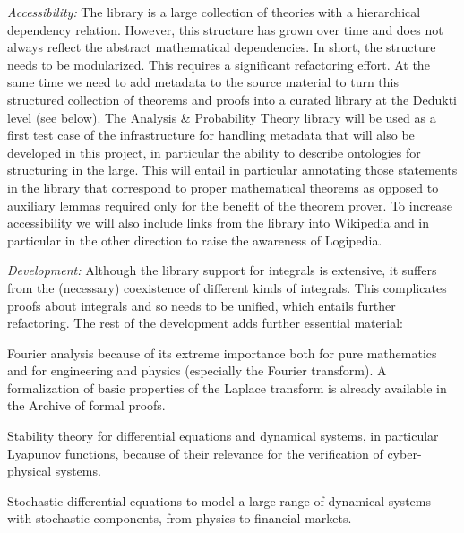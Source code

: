 \emph{Accessibility:}
The library is a large collection of theories with a hierarchical dependency
relation. However, this structure has grown over time and does not always
reflect the abstract mathematical dependencies. In short, the structure needs
to be modularized. This requires a significant refactoring effort.
%
At the same time we need to add metadata to the source material to turn this
structured collection of theorems and proofs into a curated library at the
Dedukti level (see below). The Analysis \& Probability Theory library will be
used as a first test case of the infrastructure
for handling metadata that will also be developed in this project, in
particular the ability to describe ontologies for structuring in the large.
This will entail in particular annotating those statements in the library that
correspond to proper mathematical theorems as opposed to auxiliary lemmas
required only for the benefit of the theorem prover.
To increase accessibility we will also include links from the library into
Wikipedia and in particular in the other direction to raise the awareness
of Logipedia.

\emph{Development:}
Although the library support for integrals is extensive, it suffers
from the (necessary) coexistence of different kinds of
integrals. This complicates proofs about integrals and so needs
to be unified, which entails further refactoring. The rest of the
development adds further essential material:
\begin{compactitem}
\item Fourier analysis because of its extreme importance both for pure mathematics and for
engineering and physics (especially the Fourier
transform). A formalization of basic properties of the Laplace transform is already available in the Archive of formal proofs.
\item Stability theory for differential equations and
dynamical systems, in particular Lyapunov functions, because of their
relevance for the verification of cyber-physical systems.
\item Stochastic differential equations to model a large range of
dynamical systems with stochastic components, from physics to financial markets.
\end{compactitem}

